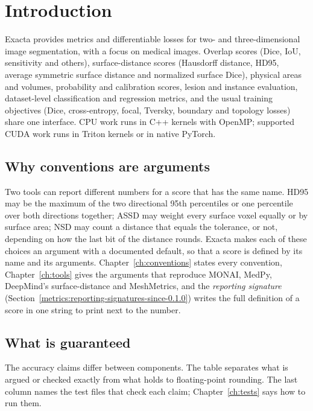 \chapter{Introduction}\label{ch:introduction}

Exacta provides metrics and differentiable losses for two- and three-dimensional image
segmentation, with a focus on medical images. Overlap scores (Dice, IoU, sensitivity and
others), surface-distance scores (Hausdorff distance, HD95, average symmetric surface distance
and normalized surface Dice), physical areas and volumes, probability and calibration scores,
lesion and instance evaluation, dataset-level classification and regression metrics, and the
usual training objectives (Dice, cross-entropy, focal, Tversky, boundary and topology losses)
share one interface. CPU work runs in C++ kernels with OpenMP; supported CUDA work runs in
Triton kernels or in native PyTorch.

\section{Why conventions are arguments}\label{introduction:why}

Two tools can report different numbers for a score that has the same name. HD95 may be the
maximum of the two directional 95th percentiles or one percentile over both directions
together; ASSD may weight every surface voxel equally or by surface area; NSD may count a
distance that equals the tolerance, or not, depending on how the last bit of the distance
rounds. Exacta makes each of these choices an argument with a documented default, so that a
score is defined by its name and its arguments. Chapter~\ref{ch:conventions} states every
convention, Chapter~\ref{ch:tools} gives the arguments that reproduce MONAI, MedPy, DeepMind's
surface-distance and MeshMetrics, and the \emph{reporting signature}
(Section~\ref{metrics:reporting-signatures-since-0.1.0}) writes the full definition of a score in one string to
print next to the number.

\section{What is guaranteed}\label{introduction:guarantees}

The accuracy claims differ between components. The table separates what is argued or checked
exactly from what holds to floating-point rounding. The last column names the test files that
check each claim; Chapter~\ref{ch:tests} says how to run them.

